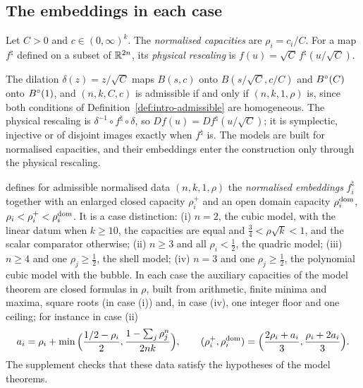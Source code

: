 \subsection{The embeddings in each case}\label{sec:ham-embeddings}

\begin{definition}[Normalisation]\label{def:ham-normalise}
Let $C>0$ and $c\in(0,\infty)^k$. The \emph{normalised capacities} are $\rho_i=c_i/C$. For a map $f^\natural$
defined on a subset of $\mathbb{R}^{2n}$, its \emph{physical rescaling} is $f(u)=\sqrt C\,f^\natural(u/\sqrt C)$.
\end{definition}

The dilation $\delta(z)=z/\sqrt C$ maps $B(s,c)$ onto $B(s/\sqrt C,c/C)$ and $B^{\circ}(C)$ onto $B^{\circ}(1)$, and
$(n,k,C,c)$ is admissible if and only if $(n,k,1,\rho)$ is, since both conditions of
Definition~\ref{def:intro-admissible} are homogeneous. The physical rescaling is $\delta^{-1}\circ f^\natural\circ\delta$,
so $Df(u)=Df^\natural(u/\sqrt C)$; it is symplectic, injective or of disjoint images exactly when $f^\natural$ is.
The models are built for normalised capacities, and their embeddings enter the construction only through the
physical rescaling.

 defines for admissible normalised data
$(n,k,1,\rho)$ the \emph{normalised embeddings} $f^\natural_i$ together with an enlarged closed capacity $\rho_i^+$ and an open
domain capacity $\rho_i^{\rm dom}$, $\rho_i<\rho_i^+<\rho_i^{\rm dom}$. It is a case distinction: (i) $n=2$, the cubic
model, with the linear datum when $k\ge10$, the capacities are equal and $\frac34<\rho\sqrt k<1$, and the scalar
comparator otherwise; (ii) $n\ge3$ and all $\rho_i<\frac12$, the quadric model; (iii) $n\ge4$ and one $\rho_j\ge\frac12$,
the shell model; (iv) $n=3$ and one $\rho_j\ge\frac12$, the polynomial cubic model with the bubble. In each case the
auxiliary capacities of the model theorem are closed formulas in $\rho$, built from arithmetic, finite minima and
maxima, square roots (in case (i)) and, in case (iv), one integer floor and one ceiling; for instance in case (ii)
\[
 a_i=\rho_i+\min\Big(\frac{1/2-\rho_i}{2},\frac{1-\sum_j\rho_j^n}{2nk}\Big),\qquad
 (\rho_i^+,\rho_i^{\rm dom})=\Big(\frac{2\rho_i+a_i}3,\frac{\rho_i+2a_i}3\Big).
\]
The supplement checks that these data satisfy the hypotheses of the model theorems.

